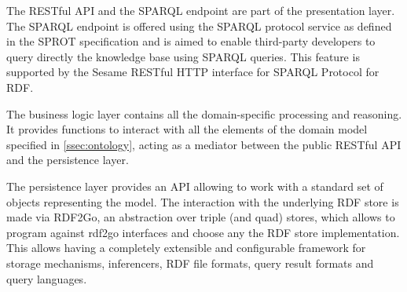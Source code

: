 The RESTful API and the SPARQL endpoint are part of the presentation layer. The SPARQL endpoint is offered using the SPARQL protocol service as defined in the SPROT specification \cite{sprot} and is aimed to enable third-party developers to query directly the knowledge base using SPARQL queries. This feature is supported by the Sesame RESTful HTTP interface for SPARQL Protocol for RDF.

The business logic layer contains all the domain-specific processing and reasoning. It provides functions to interact with all the elements of the domain model specified in \ref{ssec:ontology},
acting as a mediator between the public RESTful API and the persistence layer.

The persistence layer provides an API allowing to work with a standard set of objects representing the model. The interaction with the underlying RDF store is made via RDF2Go, an abstraction over triple (and quad) stores, which allows to program against rdf2go interfaces and choose any the RDF store implementation. This allows having a completely extensible and configurable framework for storage mechanisms, inferencers, RDF file formats, query result formats and query languages.





